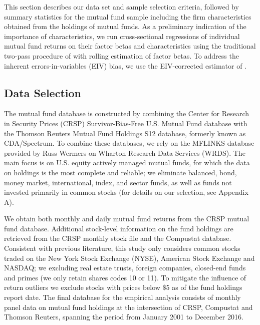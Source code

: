 \label{holdings}
 This section describes our data set and sample selection criteria, followed by summary statistics for the mutual fund sample including the firm characteristics obtained from the holdings of mutual funds. As a preliminary indication of the importance of characteristics, we run cross-sectional regressions of individual mutual fund returns on their factor betas and characteristics using the traditional two-pass procedure of \citet{fama1973risk} with rolling estimation of factor betas. To address the inherent errors-in-variables (EIV) bias, we use the EIV-corrected estimator of \citet{chordia2015cross}. 

\subsection{Data Selection}
The mutual fund database is constructed by combining the Center for Research in Security Prices (CRSP) Survivor-Bias-Free U.S. Mutual Fund database with the Thomson Reuters Mutual Fund Holdings S12 database, formerly known as CDA/Spectrum. To combine these databases, we rely on the MFLINKS database provided by Russ Wermers on Wharton Research Data Services (WRDS). The main focus is on U.S. equity actively managed mutual funds, for which the data on holdings is the most complete and reliable; we eliminate balanced, bond, money market, international, index, and sector funds, as well as funds not invested primarily in common stocks (for details on our selection, see Appendix A). 
\par 
We obtain both monthly and daily mutual fund returns from the CRSP mutual fund database. Additional stock-level information on the fund holdings are retrieved from the CRSP monthly stock file and the Compustat database. Consistent with previous literature, this study only considers common stocks traded on the New York Stock Exchange (NYSE), American Stock Exchange and NASDAQ; we excluding real estate trusts, foreign companies, closed-end funds and primes (we only retain shares codes 10 or 11). To mitigate the influence of return outliers we exclude stocks with prices below \$5 as of the fund holdings report date. The final database for the empirical analysis consists of monthly panel data on mutual fund holdings at the intersection of CRSP, Compustat and Thomson Reuters, spanning the period from January 2001 to December 2016. 

